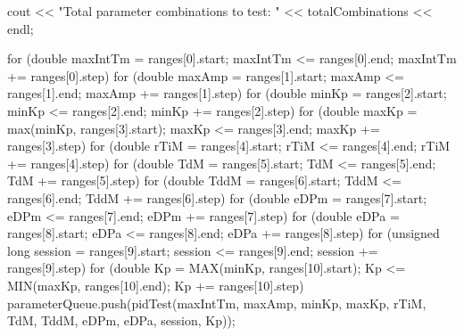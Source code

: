 \documentclass[a4paper,12pt]{article}
\begin{document}
\begin{lstlising}[language=C++]
\begin{lstlising}[language=C++]
{        cout << "Total parameter combinations to test: " << totalCombinations << endl;

        for (double maxIntTm = ranges[0].start; maxIntTm <= ranges[0].end; maxIntTm += ranges[0].step)
        {
                for (double maxAmp = ranges[1].start; maxAmp <= ranges[1].end; maxAmp += ranges[1].step)
                {
                        for (double minKp = ranges[2].start; minKp <= ranges[2].end; minKp += ranges[2].step)
                        {
                                for (double maxKp = max(minKp, ranges[3].start);
                                         maxKp <= ranges[3].end; maxKp += ranges[3].step)
                                {
                                        for (double rTiM = ranges[4].start; rTiM <= ranges[4].end; rTiM += ranges[4].step)
                                        {
                                                for (double TdM = ranges[5].start; TdM <= ranges[5].end; TdM += ranges[5].step)
                                                {
                                                        for (double TddM = ranges[6].start; TddM <= ranges[6].end; TddM += ranges[6].step)
                                                        {
                                                                for (double eDPm = ranges[7].start; eDPm <= ranges[7].end; eDPm += ranges[7].step)
                                                                {
                                                                        for (double eDPa = ranges[8].start; eDPa <= ranges[8].end; eDPa += ranges[8].step)
                                                                        {
                                                                                for (unsigned long session = ranges[9].start; session <= ranges[9].end; session += ranges[9].step)
                                                                                {
                                                                                        for (double Kp = MAX(minKp, ranges[10].start);
                                                                                                 Kp <= MIN(maxKp, ranges[10].end); Kp += ranges[10].step)
                                                                                        {
                                                                                                parameterQueue.push(pidTest({maxIntTm, maxAmp, minKp, maxKp, rTiM, TdM, TddM, eDPm, eDPa, session, Kp}));
                                                                                        }
                                                                                }
                                                                        }
                                                                }
                                                        }
                                                }
                                        }
                                }
                        }
                }
        }

}
\end{lstlising}
\end{lstlising}
\end{document}
